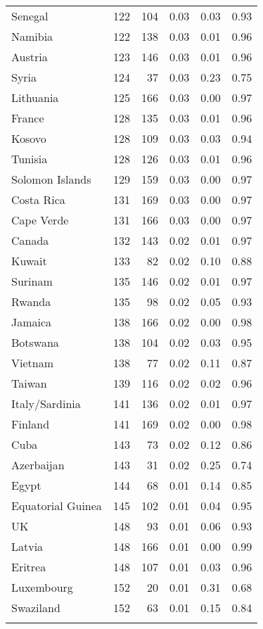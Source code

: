 \begin{longtable}[t]{lrrrrr}
\addlinespace
Senegal & 122 & 104 & 0.03 & 0.03 & 0.93\\
Namibia & 122 & 138 & 0.03 & 0.01 & 0.96\\
Austria & 123 & 146 & 0.03 & 0.01 & 0.96\\
Syria & 124 & 37 & 0.03 & 0.23 & 0.75\\
Lithuania & 125 & 166 & 0.03 & 0.00 & 0.97\\
\addlinespace
France & 128 & 135 & 0.03 & 0.01 & 0.96\\
Kosovo & 128 & 109 & 0.03 & 0.03 & 0.94\\
Tunisia & 128 & 126 & 0.03 & 0.01 & 0.96\\
Solomon Islands & 129 & 159 & 0.03 & 0.00 & 0.97\\
Costa Rica & 131 & 169 & 0.03 & 0.00 & 0.97\\
\addlinespace
Cape Verde & 131 & 166 & 0.03 & 0.00 & 0.97\\
Canada & 132 & 143 & 0.02 & 0.01 & 0.97\\
Kuwait & 133 & 82 & 0.02 & 0.10 & 0.88\\
Surinam & 135 & 146 & 0.02 & 0.01 & 0.97\\
Rwanda & 135 & 98 & 0.02 & 0.05 & 0.93\\
\addlinespace
Jamaica & 138 & 166 & 0.02 & 0.00 & 0.98\\
Botswana & 138 & 104 & 0.02 & 0.03 & 0.95\\
Vietnam & 138 & 77 & 0.02 & 0.11 & 0.87\\
Taiwan & 139 & 116 & 0.02 & 0.02 & 0.96\\
Italy/Sardinia & 141 & 136 & 0.02 & 0.01 & 0.97\\
\addlinespace
Finland & 141 & 169 & 0.02 & 0.00 & 0.98\\
Cuba & 143 & 73 & 0.02 & 0.12 & 0.86\\
Azerbaijan & 143 & 31 & 0.02 & 0.25 & 0.74\\
Egypt & 144 & 68 & 0.01 & 0.14 & 0.85\\
Equatorial Guinea & 145 & 102 & 0.01 & 0.04 & 0.95\\
\addlinespace
UK & 148 & 93 & 0.01 & 0.06 & 0.93\\
Latvia & 148 & 166 & 0.01 & 0.00 & 0.99\\
Eritrea & 148 & 107 & 0.01 & 0.03 & 0.96\\
Luxembourg & 152 & 20 & 0.01 & 0.31 & 0.68\\
Swaziland & 152 & 63 & 0.01 & 0.15 & 0.84\\
\addlinespace

\end{longtable}
